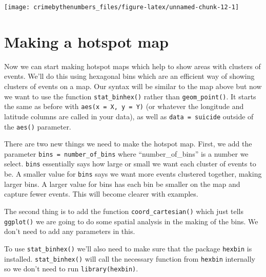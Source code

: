 \documentclass[
]{krantz}
\makeatletter
\newenvironment{Shaded}{\begin{snugshade}}{\end{snugshade}}
\newcommand{\AttributeTok}[1]{\textcolor[rgb]{0.61,0.61,0.61}{#1}}
\newcommand{\FunctionTok}[1]{\textcolor[rgb]{0,0,0}{#1}}
\newcommand{\NormalTok}[1]{#1}
\newcommand{\SpecialCharTok}[1]{\textcolor[rgb]{0,0,0}{#1}}
\newcommand{\StringTok}[1]{\textcolor[rgb]{0.5,0.5,0.5}{#1}}
\newenvironment{kframe}{%
\medskip{}
\setlength{\fboxsep}{.8em}
 \def\at@end@of@kframe{}%
 \ifinner\ifhmode%
  \def\at@end@of@kframe{\end{minipage}}%
  \begin{minipage}{\columnwidth}%
 \fi\fi%
 \def\FrameCommand##1{\hskip\@totalleftmargin \hskip-\fboxsep
 \colorbox{shadecolor}{##1}\hskip-\fboxsep
     \hskip-\linewidth \hskip-\@totalleftmargin \hskip\columnwidth}%
 \MakeFramed {\advance\hsize-\width
   \@totalleftmargin\z@ \linewidth\hsize
   \@setminipage}}%
 {\par\unskip\endMakeFramed%
 \at@end@of@kframe}
\renewenvironment{Shaded}{\begin{kframe}}{\end{kframe}}
\makeatother
\begin{document}
\begin{Shaded}
\end{Shaded}

\begin{center}\texttt{[image: crimebythenumbers\_files/figure-latex/unnamed-chunk-12-1]} \end{center}

\hypertarget{making-a-hotspot-map}{%
\section{Making a hotspot map}\label{making-a-hotspot-map}}

Now we can start making hotspot maps which help to show areas with clusters of events. We'll do this using hexagonal bins which are an efficient way of showing clusters of events on a map. Our syntax will be similar to the map above but now we want to use the function \texttt{stat\_binhex()} rather than \texttt{geom\_point()}. It starts the same as before with \texttt{aes(x\ =\ X,\ y\ =\ Y)} (or whatever the longitude and latitude columns are called in your data), as well as \texttt{data\ =\ suicide} outside of the \texttt{aes()} parameter.

There are two new things we need to make the hotspot map. First, we add the parameter \texttt{bins\ =\ number\_of\_bins} where ``number\_of\_bins'' is a number we select. \texttt{bins} essentially says how large or small we want each cluster of events to be. A smaller value for \texttt{bins} says we want more events clustered together, making larger bins. A larger value for bins has each bin be smaller on the map and capture fewer events. This will become clearer with examples.

The second thing is to add the function \texttt{coord\_cartesian()} which just tells \texttt{ggplot()} we are going to do some spatial analysis in the making of the bins. We don't need to add any parameters in this.

To use \texttt{stat\_binhex()} we'll also need to make sure that the package \texttt{hexbin} is installed. \texttt{stat\_binhex()} will call the necessary function from \texttt{hexbin} internally so we don't need to run \texttt{library(hexbin)}.
\end{document}
